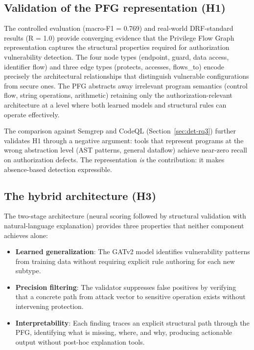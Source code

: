 \subsection{Validation of the PFG representation (H1)}
\label{sec:det-h1-validation}

The controlled evaluation (macro-F1 = 0.769) and real-world DRF-standard results
(R = 1.0) provide converging evidence that the Privilege Flow Graph
representation captures the structural properties required for authorization
vulnerability detection. The four node types (endpoint, guard, data access,
identifier flow) and three edge types (protects, accesses, flows\_to) encode
precisely the architectural relationships that distinguish vulnerable
configurations from secure ones. The PFG abstracts away irrelevant program
semantics (control flow, string operations, arithmetic) retaining only
the authorization-relevant architecture at a level where both learned models
and structural rules can operate effectively.

The comparison against Semgrep and CodeQL (Section~\ref{sec:det-rq3})
further validates H1 through a negative argument: tools that represent
programs at the wrong abstraction level (AST patterns, general dataflow)
achieve near-zero recall on authorization defects. The representation
\emph{is} the contribution: it makes absence-based detection expressible.

\subsection{The hybrid architecture (H3)}
\label{sec:det-h3-validation}

The two-stage architecture (neural scoring followed by structural
validation with natural-language explanation) provides three properties
that neither component achieves alone:
\begin{itemize}
    \item \textbf{Learned generalization}: The GATv2 model identifies
    vulnerability patterns from training data without requiring explicit rule
    authoring for each new subtype.
    \item \textbf{Precision filtering}: The validator suppresses false
    positives by verifying that a concrete path from attack vector to
    sensitive operation exists without intervening protection.
    \item \textbf{Interpretability}: Each finding traces an explicit
    structural path through the PFG, identifying what is missing, where,
    and why, producing actionable output without post-hoc explanation tools.
\end{itemize}

